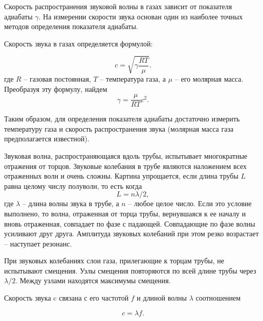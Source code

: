 \documentclass[a4paper,12pt]{article} %
\begin{document}
Скорость распространения звуковой волны в газах зависит от показателя адиабаты $ \gamma $. На измерении скорости звука основан один из наиболее точных методов определения показателя адиабаты.

Скорость звука в газах определяется формулой:

\begin{equation}\label{velocity}
c=\sqrt{\gamma\frac{RT}{\mu}}.
\end{equation}
где $ R $ -- газовая постоянная, $ T $ -- температура газа, а $ \mu $ -- его молярная масса. Преобразуя эту формулу, найдем
\begin{equation}\label{gamma}
\boxed{\gamma = \frac{\mu}{RT}c^2}.
\end{equation}

Таким образом, для определения показателя адиабаты достаточно измерить температуру газа и скорость распространения звука (молярная масса газа предполагается известной).

Звуковая волна, распространяющаяся вдоль трубы, испытывает многократные отражения от торцов. Звуковые колебания в трубе являются наложением всех отраженных волн и очень сложны. Картина упрощается, если длина трубы $ L $ равна целому числу полуволн, то есть когда \[ L=n\lambda/2, \] где $ \lambda $ -- длина волны звука в трубе, а $ n $ -- любое целое число. Если это условие выполнено, то волна, отраженная от торца трубы, вернувшаяся к ее началу и вновь отраженная, совпадает по фазе с падающей. Совпадающие по фазе волны усиливают друг друга. Амплитуда звуковых колебаний при этом резко возрастает -- наступает резонанс.

При звуковых колебаниях слои газа, прилегающие к торцам трубы, не испытывают смещения. Узлы смещения повторяются по всей длине трубы через $ \lambda/2 $. Между узлами находятся максимумы смещения.

Скорость звука c связана с его частотой $ f $ и длиной волны $ \lambda $ соотношением

\begin{equation}\label{lambda_f}
c=\lambda f.
\end{equation}
\end{document}
